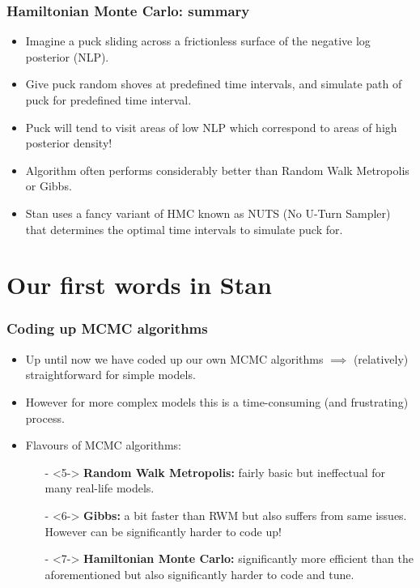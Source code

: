 \documentclass[handout]{beamer}
\begin{document}
\begin{frame}
	\frametitle{Hamiltonian Monte Carlo: summary}
	
	\begin{itemize}
		\item<2-> Imagine a puck sliding across a frictionless surface of the negative log posterior (NLP).
		\item<3-> Give puck random shoves at predefined time intervals, and simulate path of puck for predefined time interval.
		\item<4-> Puck will tend to visit areas of low NLP which correspond to areas of high posterior density!
		\item<5-> Algorithm often performs considerably better than Random Walk Metropolis or Gibbs.
		\item<6-> Stan uses a fancy variant of HMC known as NUTS (No U-Turn Sampler) that determines the optimal time intervals to simulate puck for.
	\end{itemize}
	
\end{frame}


\section{Our first words in Stan}
\frame{\tableofcontents[currentsection]}

\begin{frame}
\frametitle{Coding up MCMC algorithms}
\begin{itemize}
\item<2-> Up until now we have coded up our own MCMC algorithms
$\implies$ (relatively) straightforward for simple models.
\item<3-> However for more complex models this is a time-consuming (and frustrating) process.
\item<4-> Flavours of MCMC algorithms:
\begin{itemize}
\item[-]<5-> \textbf{Random Walk Metropolis:} fairly basic but ineffectual for many real-life models.
\item[-]<6-> \textbf{Gibbs:} a bit faster than RWM but also suffers from same issues. However can be significantly harder to code up!
\item[-]<7-> \textbf{Hamiltonian Monte Carlo:} significantly more efficient than the aforementioned but also significantly harder to code and tune.
\end{itemize}
\end{itemize}


\end{frame}
\end{document}

